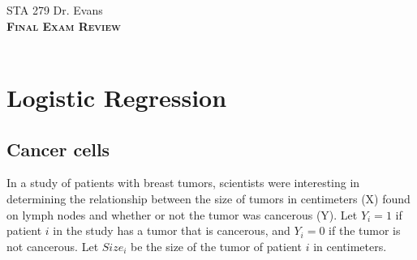 \documentclass[11pt]{article}
\newcommand{\ttl}[1]{ \textsc{{\LARGE \textbf{{\color{black} #1} } }}}
\begin{document}
STA 279 \hfill Dr. Evans \\

\ttl{Final Exam Review\\ } \\

\section{Logistic Regression}

\subsection{Cancer cells}

In a study of patients with breast tumors, scientists were interesting in determining the relationship between the size of tumors in centimeters (X) found on lymph nodes and whether or not the tumor was cancerous (Y). Let $Y_i = 1$ if patient $i$ in the study has a tumor that is cancerous, and $Y_i = 0$ if the tumor is not cancerous. Let $Size_i$ be the size of the tumor of patient $i$ in centimeters. 

\vspace{.2cm}
\end{document}

